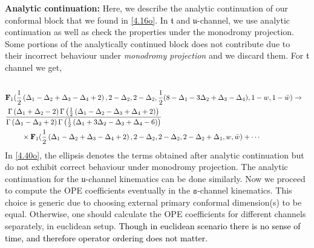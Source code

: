 \noindent
\textbf{Analytic continuation:}
\noindent
Here, we describe the analytic continuation of our conformal block that we found in \eqref{4.16o}. In $\mathfrak{t}$ and $\mathfrak{u}$-channel, we use analytic continuation as well as check the properties under the monodromy projection. Some portions of the analytically continued block does not contribute due to their incorrect behaviour under \textit{monodromy projection} \cite{Simmons-Duffin:2012juh} and we discard them. For $\mathfrak{t}$  channel we get, 
\begin{align}
\begin{split}
\label{4.40o}
    \\& \mathbf{F}_1(\frac{1}{2} \left(\Delta _1-\Delta _2+\Delta _3-\Delta _4+2\right),2-\Delta_2,2-\Delta_2,\frac{1}{2}(8-\Delta_1-3\Delta_2+\Delta_3-\Delta_4),1-w,1-\bar w)\to \\&
   \frac{\Gamma \left(\Delta _1+\Delta _2-2\right) \Gamma \left(\frac{1}{2} \left(\Delta _1-\Delta _2-\Delta _3+\Delta _4+2\right)\right)}{\Gamma \left(\Delta _1-\Delta _2+2\right) \Gamma \left(\frac{1}{2} \left(\Delta _1+3 \Delta _2-\Delta _3+\Delta _4-6\right)\right)}\\&\hspace{0.8cm} \times\mathbf{F}_1(\frac{1}{2} \left(\Delta _1-\Delta _2+\Delta _3-\Delta _4+2\right),2-\Delta_2,2-\Delta_2,2-\Delta_2+\Delta_1,w,\bar w)+\cdots
 \end{split} 
\end{align}
In \eqref{4.40o}, the ellipsis denotes the terms obtained after analytic continuation but do not exhibit correct behaviour under monodromy projection.
The analytic continuation for the $\mathfrak{u}$-channel kinematics can be done similarly.
Now we proceed to compute the OPE coefficients eventually in the $\texttt{s}$-channel kinematics. This choice is generic due to choosing external primary conformal dimension(s) to be equal. Otherwise, one should calculate the OPE coefficients for different channels separately, in euclidean setup. \textcolor{black}{ Though in euclidean scenario there is no sense of time, and therefore operator ordering does not matter. }

